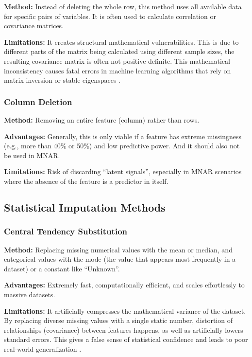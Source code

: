 \documentclass[journal]{IEEEtran}
\begin{document}
\noindent \textbf{Method:} Instead of deleting the whole row, this method uses all available data for specific pairs of variables. It is often used to calculate correlation or covariance matrices.

\noindent \textbf{Limitations:} It creates structural mathematical vulnerabilities. This is due to different parts of the matrix being calculated using different sample sizes, the resulting covariance matrix is often not positive definite. This mathematical inconsistency causes fatal errors in machine learning algorithms that rely on matrix inversion or stable eigenspaces \cite{cohen2026methods}.

\subsubsection{Column Deletion}

\noindent \textbf{Method:} Removing an entire feature (column) rather than rows.

\noindent \textbf{Advantages:} Generally, this is only viable if a feature has extreme missingness (e.g., more than 40\% or 50\%) and low predictive power. And it should also not be used in MNAR.

\noindent \textbf{Limitations:} Risk of discarding ``latent signals'', especially in MNAR scenarios where the absence of the feature is a predictor in itself.

\subsection{Statistical Imputation Methods}

\subsubsection{Central Tendency Substitution}

\noindent \textbf{Method:} Replacing missing numerical values with the mean or median, and categorical values with the mode (the value that appears most frequently in a dataset) or a constant like ``Unknown''.

\noindent \textbf{Advantages:} Extremely fast, computationally efficient, and scales effortlessly to massive datasets.

\noindent \textbf{Limitations:} It artificially compresses the mathematical variance of the dataset. By replacing diverse missing values with a single static number, distortion of relationships (covariance) between features happens, as well as artificially lowers standard errors. This gives a false sense of statistical confidence and leads to poor real-world generalization \cite{meng2025comparative}.
\end{document}
